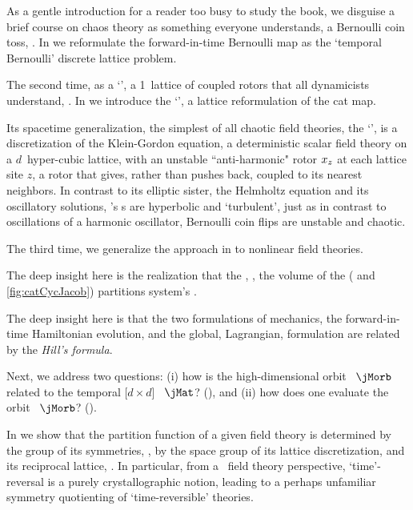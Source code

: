 As a gentle introduction
for a reader too busy to study the book, we
disguise a brief course on chaos theory as something everyone
understands, a Bernoulli coin toss, . In
 we reformulate the forward-in-time Bernoulli map as
the `{temporal Bernoulli}' discrete lattice problem.

The second time,
as a `\templatt', a 1\dmn\ lattice of coupled rotors that all dynamicists
understand, . In  we introduce
the `\templatt', a lattice reformulation of the cat map.

Its spacetime generalization, the simplest of all chaotic field theories, the
`\catlatt', is a discretization of the
Klein-Gordon equation, a deterministic scalar field theory on a $d$\dmn\ hyper-cubic
lattice, with an unstable ``anti-harmonic" rotor $x_{z}$ at each
lattice site $z$, a rotor that gives, rather than pushes back, coupled to
its nearest neighbors.
In contrast to its elliptic sister, the Helmholtz equation and its
oscillatory solutions, {\catlatt}'s {\lattstate}s are hyperbolic and
`turbulent', just as in contrast to oscillations of a harmonic
oscillator, Bernoulli coin flips are unstable and chaotic.

The third time,
we generalize the approach in  %
to nonlinear field theories.

The deep insight
here is the realization that the {\em\HillDet}, \ie, the volume of the
{\em\jacobianOrb} ( and \ref{fig:catCycJacob})
partitions system's \statesp.

The deep insight here is that the two formulations of mechanics, the
forward-in-time Hamiltonian evolution, and the global, Lagrangian,
{\templatt} formulation are related by the {\em Hill's formula}.

Next, we address two questions:
(i) how is the high-dimensional orbit \jacobianM\ $\jMorb$ related
to the temporal [$d\!\times\!d$] \jacobianM\ $\jMat$?
(),
and
(ii) how does one evaluate the orbit \jacobianM\ $\jMorb$?
().


In  we show that the partition function of a
given field theory is determined by the group of its symmetries, \ie,
by the space group of its lattice discretization,
and its reciprocal lattice, .
In particular, from a \spt\ field theory perspective, `time'-reversal is
a purely crystallographic notion, leading to a perhaps unfamiliar
symmetry quotienting of `time-reversible' theories.

